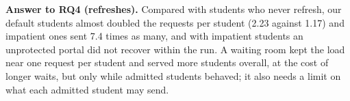 \textbf{Answer to RQ4 (refreshes).} Compared with students who never refresh,
our default students almost doubled the requests per student (2.23 against
1.17) and impatient ones sent 7.4 times as many, and with impatient students an
unprotected portal did not recover within the run. A waiting room kept the load near one request
per student and served more students overall, at the cost of longer waits, but
only while admitted students behaved; it also needs a limit on what each
admitted student may send.
